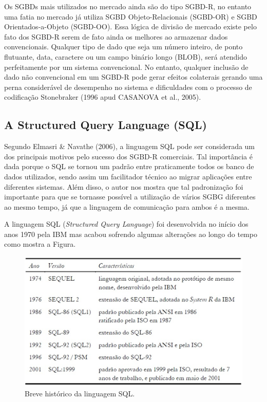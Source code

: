		Os SGBDs mais utilizados no mercado ainda são do tipo SGBD-R, no entanto uma fatia no mercado já utiliza SGBD Objeto-Relacionais (SGBD-OR) e SGBD Orientados-a-Objeto (SGBD-OO). Essa lógica de divisão de mercado existe pelo fato dos SGBD-R serem de fato ainda os melhores ao armazenar dados convencionais. Qualquer tipo de dado que seja um número inteiro, de ponto flutuante, data, caractere ou um campo binário longo (BLOB), será atendido perfeitamente por um sistema convencional. No entanto, qualquer inclusão de dado não convencional em um SGBD-R pode gerar efeitos colaterais gerando uma perna considerável de desempenho no sistema e dificuldades com o processo de codificação Stonebraker (1996\cite{STONEBRAKER} apud CASANOVA et al., 2005\cite{CASANOVA_etal05}).
		
		\subsection{A Structured Query Language (SQL)}
		
		Segundo Elmasri \& Navathe (2006)\cite{ELMASRI_NAVATHE}, a linguagem SQL pode ser considerada um dos principais motivos pelo sucesso dos SGBD-R comerciais. Tal importância é dada porque o SQL se tornou um padrão entre praticamente todos os banco de dados utilizados, sendo assim um facilitador técnico ao migrar aplicações entre diferentes sistemas. Além disso, o autor nos mostra que tal padronização foi importante para que se tornasse possível a utilização de vários SGBG diferentes ao mesmo tempo, já que a linguagem de comunicação para ambos é a mesma.
		
		A linguagem SQL (\textit{Structured Query Language}) foi desenvolvida no início dos anos 1970 pela IBM mas acabou sofrendo algumas alterações ao longo do tempo como mostra a Figura.
		
		\begin{figure}
			\centering
			\includegraphics[width=1\linewidth]{data/sql_history}
			\caption{Breve histórico da linguagem SQL. \cite{CASANOVA_etal05}}
			\label{fig:sqlhistory}
		\end{figure}
		

